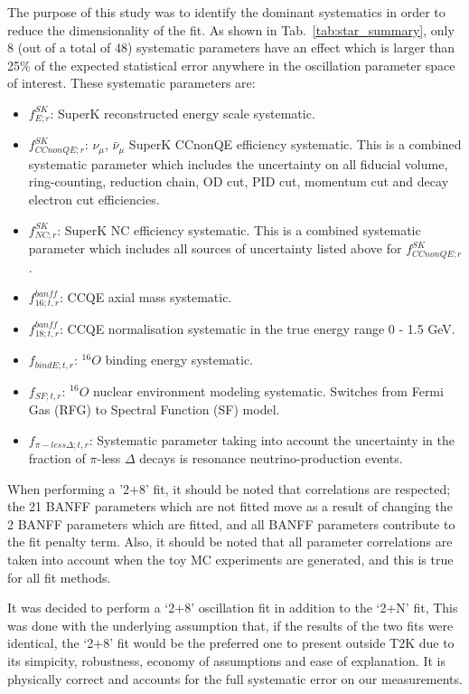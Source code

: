 The purpose of this study was to identify the dominant systematics in order to reduce
the dimensionality of the fit. As shown in Tab.\ \ref{tab:star_summary}, 
only 8 (out of a total of 48) systematic parameters have an effect which is larger than
25\% of the expected statistical error anywhere in the oscillation parameter space of interest.
These systematic parameters are:
\begin{itemize}
\item
$f_{E; r}^{SK}$: 
SuperK reconstructed energy scale systematic.
\item
$f_{CCnonQE; r}^{SK}$: 
$\nu_\mu$, $\bar{\nu}_{\mu}$ SuperK CCnonQE efficiency systematic.
This is a combined systematic parameter which includes the uncertainty on all 
fiducial volume, ring-counting, reduction chain, OD cut, PID cut, momentum cut and decay electron cut efficiencies.
\item
$f_{NC; r}^{SK}$:
SuperK NC efficiency systematic.
This is a combined systematic parameter which includes all sources of uncertainty listed above for $f_{CCnonQE; r}^{SK}$.
\item
$f_{16; t, r}^{banff}$:
CCQE axial mass systematic.
\item
$f_{18; t, r}^{banff}$:
CCQE normalisation systematic in the true energy range 0 - 1.5 GeV.
\item
$f_{bindE; t, r}$:
$^{16}O$ binding energy systematic.
\item
$f_{SF; t, r}$:
$^{16}O$ nuclear environment modeling systematic. Switches from Fermi Gas (RFG) to Spectral Function (SF) model.
\item
$f_{\pi-less\Delta; t, r}$:
Systematic parameter taking into account the uncertainty in the fraction 
of $\pi$-less $\Delta$ decays is resonance neutrino-production events.
\end{itemize}

When performing a '2+8' fit, it should be noted that correlations are
respected; the 21 BANFF parameters which are not fitted move as a result
of changing the 2 BANFF parameters which are fitted,
and all BANFF parameters contribute to the fit penalty term.
Also, it should be noted that all parameter correlations are taken
into account when the toy MC experiments are generated, and this is
true for all fit methods.

It was decided to perform a `2+8' oscillation fit in addition to the `2+N' fit, 
This was done with the underlying assumption that, if the results of the two fits were identical, 
the `2+8' fit would be the preferred one to present outside T2K due
to its simpicity, robustness, economy of assumptions and ease of explanation.
It is physically correct and accounts for the full
systematic error on our measurements. 


